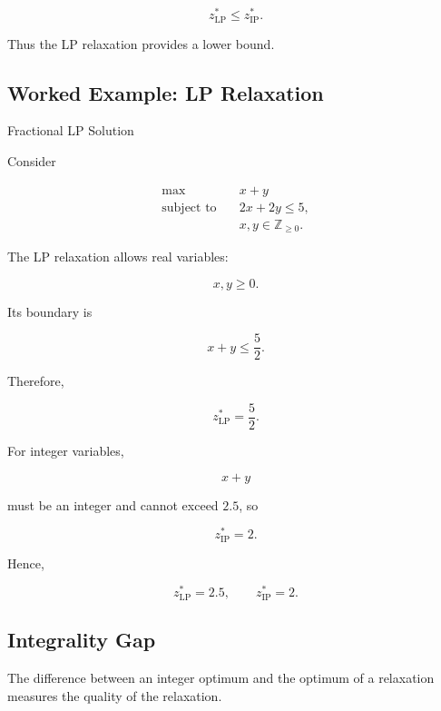\[
\boxed{
z_{\mathrm{LP}}^*
\leq
z_{\mathrm{IP}}^*.
}
\]

Thus the LP relaxation provides a lower bound.

\subsection{Worked Example: LP Relaxation}
\label{subsec:worked-ip-relaxation}

\begin{workedexamplebox}{Fractional LP Solution}

Consider

\[
\begin{aligned}
\max
\quad&
x+y
\\
\text{subject to}
\quad&
2x+2y\leq5,
\\
&
x,y\in\mathbb{Z}_{\geq0}.
\end{aligned}
\]

The LP relaxation allows real variables:

\[
x,y\geq0.
\]

Its boundary is

\[
x+y\leq\frac52.
\]

Therefore,

\[
z_{\mathrm{LP}}^*
=
\frac52.
\]

For integer variables,

\[
x+y
\]

must be an integer and cannot exceed \(2.5\), so

\[
z_{\mathrm{IP}}^*=2.
\]

Hence,

\begin{answerbox}
\[
\boxed{
z_{\mathrm{LP}}^*
=
2.5,
\qquad
z_{\mathrm{IP}}^*
=
2.
}
\]
\end{answerbox}

\end{workedexamplebox}

\subsection{Integrality Gap}
\label{subsec:integrality-gap}

The difference between an integer optimum and the optimum of a relaxation
measures the quality of the relaxation.

